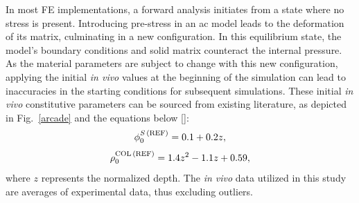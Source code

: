 \documentclass[12pt,a4paper]{report}
\begin{document}
In most FE implementations, a forward analysis initiates from a state where no stress is present. Introducing pre-stress in an \ac{ac} model leads to the deformation of its matrix, culminating in a new configuration. In this equilibrium state, the model's boundary conditions and solid matrix counteract the internal pressure. As the material parameters are subject to change with this new configuration, applying the initial \textit{in vivo} values at the beginning of the simulation can lead to inaccuracies in the starting conditions for subsequent simulations. These initial \textit{in vivo} constitutive parameters can be sourced from existing literature, as depicted in Fig.~\ref{arcade} and the equations below [\cite{wilson2007,rieppo2004,shapiro2001,lipshitz1975}]:
%
\begin{equation}
\phi_0^{S \, \rm{(REF)}}=0.1+0.2z,
\end{equation}
%
\begin{equation}
\rho_0^{\text{COL} \, (\rm{REF})}  =1.4z^2-1.1z+0.59,
\end{equation}
%
where $z$ represents the normalized depth. The \textit{in vivo} data utilized in this study are averages of experimental data, thus excluding outliers.
\end{document}
